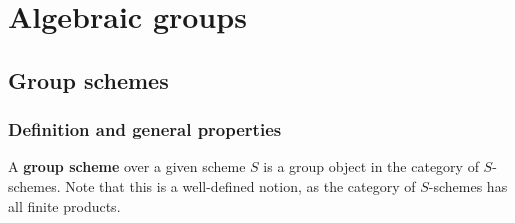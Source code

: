 \section{Algebraic groups}
    \subsection{Group schemes}
        \subsubsection{Definition and general properties}
            \begin{definition} \label{def: group_schemes}
                A \textbf{group scheme} over a given scheme $S$ is a group object in the category of $S$-schemes. Note that this is a well-defined notion, as the category of $S$-schemes has all finite products.
                

\end{definition}
